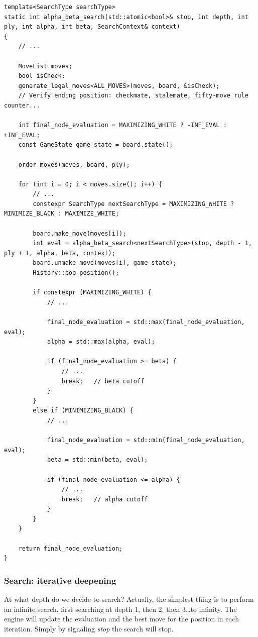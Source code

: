 \begin{lstlisting}[breaklines=true, frame=single, caption={Alpha-Beta search.}]
template<SearchType searchType>
static int alpha_beta_search(std::atomic<bool>& stop, int depth, int ply, int alpha, int beta, SearchContext& context)
{
    // ...

    MoveList moves;
    bool isCheck;
    generate_legal_moves<ALL_MOVES>(moves, board, &isCheck);
    // Verify ending position: checkmate, stalemate, fifty-move rule counter...

    int final_node_evaluation = MAXIMIZING_WHITE ? -INF_EVAL : +INF_EVAL;
    const GameState game_state = board.state();

    order_moves(moves, board, ply);

    for (int i = 0; i < moves.size(); i++) {
        // ...
        constexpr SearchType nextSearchType = MAXIMIZING_WHITE ? MINIMIZE_BLACK : MAXIMIZE_WHITE;

        board.make_move(moves[i]);
        int eval = alpha_beta_search<nextSearchType>(stop, depth - 1, ply + 1, alpha, beta, context);
        board.unmake_move(moves[i], game_state);
        History::pop_position();

        if constexpr (MAXIMIZING_WHITE) {
            // ...

            final_node_evaluation = std::max(final_node_evaluation, eval);
            alpha = std::max(alpha, eval);

            if (final_node_evaluation >= beta) {
                // ...
                break;   // beta cutoff
            }
        }
        else if (MINIMIZING_BLACK) {
            // ...

            final_node_evaluation = std::min(final_node_evaluation, eval);
            beta = std::min(beta, eval);

            if (final_node_evaluation <= alpha) {
                // ...
                break;   // alpha cutoff
            }
        }
    }

    return final_node_evaluation;
}
\end{lstlisting}

\subsubsection{Search: iterative deepening}

At what depth do we decide to search? Actually, the simplest thing is to perform an infinite search, first searching at depth 1, then 2, then 3\ldots to infinity. The engine will update the evaluation and the best move for the position in each iteration. Simply by signaling \textit{stop} the search will stop.

